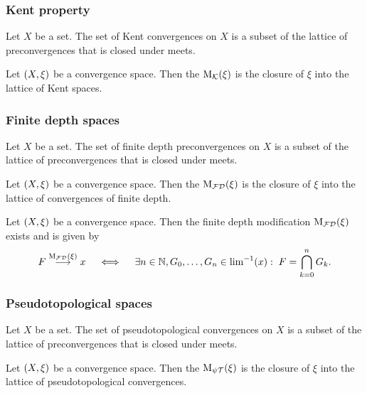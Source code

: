 \subsubsection{Kent property}
\begin{lemma}
Let $X$ be a set. The set of Kent convergences on $X$ is a subset of the lattice of preconvergences that is closed under meets.
\end{lemma}
\begin{definition}
Let $\left( X,\xi \right)$ be a convergence space. Then the  $\operatorname{M_\mathcal{K}}(\xi)$ is the closure of $\xi$ into the lattice of Kent spaces.
\end{definition}


\subsubsection{Finite depth spaces}
\begin{lemma}
Let $X$ be a set. The set of finite depth preconvergences on $X$ is a subset of the lattice of preconvergences that is closed under meets.
\end{lemma}
\begin{definition}
Let $\left( X,\xi \right)$ be a convergence space. Then the  $\operatorname{M_\mathcal{FD}}(\xi)$ is the closure of $\xi$ into the lattice of convergences of finite depth.
\end{definition}

\begin{proposition}
Let $\left( X,\xi \right)$ be a convergence space. Then the finite depth modification $\operatorname{M_\mathcal{FD}}(\xi)$ exists and is given by
\[ F \overset{\operatorname{M_\mathcal{FD}}(\xi)}{\longrightarrow} x \quad\iff\quad \exists n\in\mathbb{N}, G_0,\ldots, G_n \in {\lim}^{-1}(x): \; F = \bigcap_{k=0}^n G_k. \]
\end{proposition}

\subsubsection{Pseudotopological spaces}
\begin{lemma}
Let $X$ be a set. The set of pseudotopological convergences on $X$ is a subset of the lattice of preconvergences that is closed under meets.
\end{lemma}
\begin{definition}
Let $\left( X,\xi \right)$ be a convergence space. Then the  $\operatorname{M_{\psi\mathcal{T}}}(\xi)$ is the closure of $\xi$ into the lattice of pseudotopological convergences.
\end{definition}

